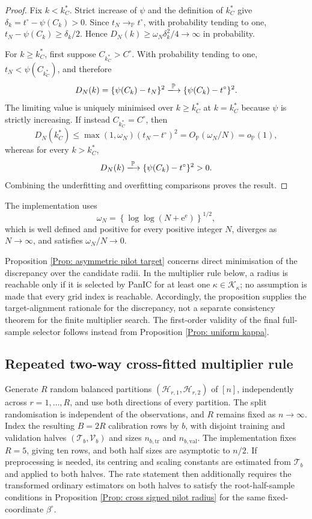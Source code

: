 \documentclass[12pt]{article}
\newenvironment{bluechange}{\begingroup\color[rgb]{0.00,0.00,1.00}}{\endgroup}
\theoremstyle{remark}
\theoremstyle{plain}
\begin{document}
\begin{bluechange}
\begin{proof}
Fix $k<k_C^*$. Strict increase of $\psi$ and the definition of $k_C^*$ give $\delta_k=t^\circ-\psi(C_k)>0$. Since $t_N\to_{\mathbb P}t^\circ$, with probability tending to one, $t_N-\psi(C_k)\ge\delta_k/2$. Hence $D_N(k)\ge\omega_N\delta_k^2/4\to\infty$ in probability.

For $k\ge k_C^*$, first suppose $C_{k_C^*}>C^\circ$. With probability tending to one, $t_N<\psi(C_{k_C^*})$, and therefore
\[
D_N(k)=\{\psi(C_k)-t_N\}^2
\xlongrightarrow{\mathbb P}
\{\psi(C_k)-t^\circ\}^2.
\]
The limiting value is uniquely minimised over $k\ge k_C^*$ at $k=k_C^*$ because $\psi$ is strictly increasing. If instead $C_{k_C^*}=C^\circ$, then
\[
D_N(k_C^*)
\le \max(1,\omega_N)(t_N-t^\circ)^2
=O_{\mathbb P}(\omega_N/N)=o_{\mathbb P}(1),
\]
whereas for every $k>k_C^*$,
\[
D_N(k)\xlongrightarrow{\mathbb P}
\{\psi(C_k)-t^\circ\}^2>0.
\]
Combining the underfitting and overfitting comparisons proves the result.
\end{proof}

The implementation uses
\[
\omega_N=
\left\{\log\!\log(N+\mathrm e^{\mathrm e})\right\}^{1/2},
\]
which is well defined and positive for every positive integer $N$, diverges as $N\to\infty$, and satisfies $\omega_N/N\to0$.

Proposition \ref{Prop: asymmetric pilot target} concerns direct minimisation of the discrepancy over the candidate radii. In the multiplier rule below, a radius is reachable only if it is selected by PanIC for at least one $\kappa\in\mathcal K_\kappa$; no assumption is made that every grid index is reachable. Accordingly, the proposition supplies the target-alignment rationale for the discrepancy, not a separate consistency theorem for the finite multiplier search. The first-order validity of the final full-sample selector follows instead from Proposition \ref{Prop: uniform kappa}.

\subsection{Repeated two-way cross-fitted multiplier rule}
Generate $R$ random balanced partitions $(\mathcal H_{r,1},\mathcal H_{r,2})$ of $[n]$, independently across $r=1,\ldots,R$, and use both directions of every partition. The split randomisation is independent of the observations, and $R$ remains fixed as $n\to\infty$. Index the resulting $B=2R$ calibration rows by $b$, with disjoint training and validation halves $(\mathcal T_b,\mathcal V_b)$ and sizes $n_{b,\mathrm{tr}}$ and $n_{b,\mathrm{val}}$. The implementation fixes $R=5$, giving ten rows, and both half sizes are asymptotic to $n/2$. If preprocessing is needed, its centring and scaling constants are estimated from $\mathcal T_b$ and applied to both halves. The rate statement then additionally requires the transformed ordinary estimators on both halves to satisfy the root-half-sample conditions in Proposition \ref{Prop: cross signed pilot radius} for the same fixed-coordinate $\beta^\circ$.


\end{bluechange}
\end{document}
